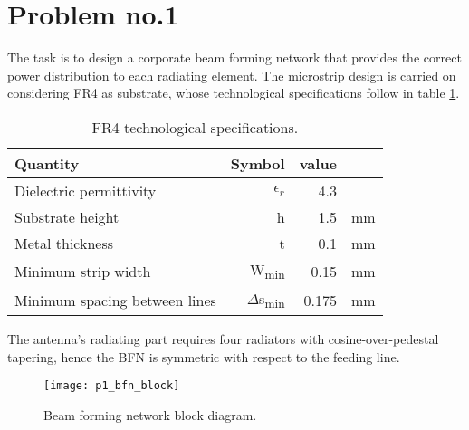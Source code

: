 \section{Problem no.1}

The task is to design a corporate beam forming network that provides the correct power distribution to each radiating element. The microstrip design is carried on considering FR4 as substrate, whose technological specifications follow in table \ref{tab:p1_FR4}.

 \begin{table} [b]
 	\label{tab:p1_FR4}
 	\caption{FR4 technological specifications.}
 	\centering	
 	\begin{tabular}{lrrr} 
 		\toprule 
 		Quantity & Symbol & value & \\
 		\midrule
		Dielectric permittivity &$\epsilon_{r}$		&4.3		& 		\\
 		Substrate height&	h				& 1.5		&  mm	\\ 
 		Metal thickness&t	& 0.1	& mm\\
 		Minimum strip width &W\textsubscript{min}&0.15 & mm \\
 		Minimum spacing between lines &$\Delta$s\textsubscript{min}&0.175 & mm \\
 		\bottomrule 
 	\end{tabular}	
 \end{table}

The antenna's radiating part requires four radiators with cosine-over-pedestal tapering, hence the BFN is symmetric with respect to the feeding line. %

\begin{figure}[t] 
	\centering
	\texttt{[image: p1\_bfn\_block]}
	\caption{Beam forming network block diagram.}
	\label{fig:p1_bfn_block}
\end{figure}


